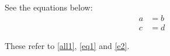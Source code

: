 \documentclass{article}
\begin{document}
See the equations below:
\begin{subequations}
\label{all1}
 \begin{align}
  a & = b \label{eq1} \\
  c & = d \label{e2}
 \end{align}
\end{subequations}

These refer to \ref{all1}, \ref{eq1} and \ref{e2}.
\end{document}
